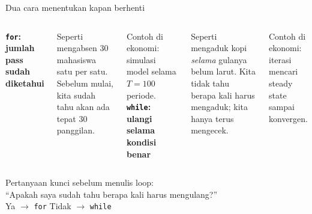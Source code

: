 \documentclass[aspectratio=169,11pt]{beamer}
\begin{document}
\begin{frame}{Dua cara menentukan kapan berhenti}
\begin{columns}[T]
\textbf{\texttt{for}: jumlah pass sudah diketahui}

\small Seperti mengabsen 30 mahasiswa satu per satu. Sebelum mulai, kita sudah
tahu akan ada tepat 30 panggilan.

\vspace{0.4em}
Contoh di ekonomi: simulasi model selama $T = 100$ periode.
\textbf{\texttt{while}: ulangi selama kondisi benar}

\small Seperti mengaduk kopi \emph{selama} gulanya belum larut. Kita tidak tahu
berapa kali harus mengaduk; kita hanya terus mengecek.

\vspace{0.4em}
Contoh di ekonomi: iterasi mencari steady state sampai konvergen.
\end{columns}

\vspace{1em}
\centering
Pertanyaan kunci sebelum menulis loop:\\[0.2em]
\alert{``Apakah saya sudah tahu berapa kali harus mengulang?''}\\[0.2em]
\small Ya $\rightarrow$ \texttt{for} \qquad Tidak $\rightarrow$ \texttt{while}
\end{frame}
\end{document}
